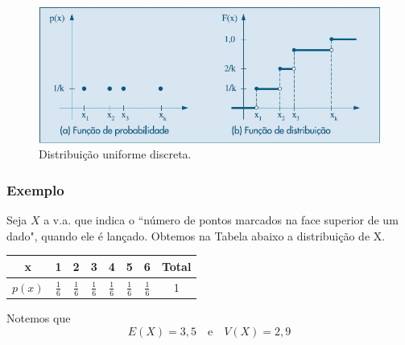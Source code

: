 \documentclass[14pt,aspectratio=1610]{beamer}
\begin{document}
\begin{frame}{}
\frametitle{}
\begin{block}{}
\justifying
\begin{figure}[H]
    \centering
    \includegraphics[scale=0.5]{figs/Uniforme}
    \caption{Distribuição uniforme discreta.} %
  \end{figure}

\end{block}
\end{frame}

\begin{frame}{}
\frametitle{Exemplo}
\begin{block}{}
\justifying
Seja $X$ a v.a. que indica o ``número de pontos marcados na face superior
de um dado", quando ele é lançado. Obtemos na Tabela abaixo a distribuição de X.
\begin{table}[h]
\begin{tabular}{c|c|c|c|c|c|c|c}
\hline
x&1&2&3&4&5&6&Total\\
\hline
$p(x)$&$\frac{1}{6}$&$\frac{1}{6}$&$\frac{1}{6}$&$\frac{1}{6}$&$\frac{1}{6}$&$\frac{1}{6}$&1\\
\hline
\end{tabular}
\end{table}
Notemos que $$E(X)=3,5\quad \textrm{e}\quad V(X)=2,9$$
\end{block}
\end{frame}
\end{document}
